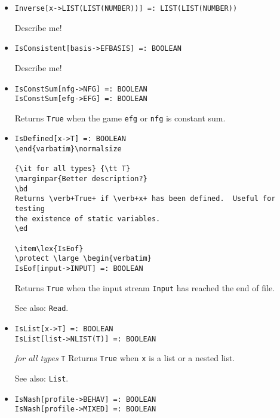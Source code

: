 \begin{itemize}
\item{}
\protect \large \begin{verbatim}
Inverse[x->LIST(LIST(NUMBER))] =: LIST(LIST(NUMBER))
\end{verbatim} \normalsize

\bd
Describe me!
\ed

\item{}
\protect \large \begin{verbatim}
IsConsistent[basis->EFBASIS] =: BOOLEAN
\end{verbatim} \normalsize

\bd
Describe me!
\ed

\item{}
\protect \large \begin{verbatim}
IsConstSum[nfg->NFG] =: BOOLEAN 
IsConstSum[efg->EFG] =: BOOLEAN 
\end{verbatim}\normalsize

\bd
Returns \verb+True+ when the game \verb+efg+ or \verb+nfg+ is constant sum.
\ed

\item{}
\protect \large \begin{verbatim}
IsDefined[x->T] =: BOOLEAN
\end{varbatim}\normalsize

{\it for all types} {\tt T}
\marginpar{Better description?}
\bd
Returns \verb+True+ if \verb+x+ has been defined.  Useful for testing
the existence of static variables.
\ed

\item\lex{IsEof}
\protect \large \begin{verbatim}
IsEof[input->INPUT] =: BOOLEAN
\end{verbatim}\normalsize

\bd
Returns \verb+True+ when the input stream \verb+Input+ has reached the
end of file.
\item [See also:] \verb+Read+.
\ed

\item{}
\protect \large \begin{verbatim}
IsList[x->T] =: BOOLEAN 
IsList[list->NLIST(T)] =: BOOLEAN 
\end{verbatim}\normalsize

{\it for all types} {\tt T}
\bd 
Returns \verb+True+ when \verb+x+ is a list or a nested list.
\item
[See also:] \verb+List+.
\ed

\item{}
\protect \large \begin{verbatim}
IsNash[profile->BEHAV] =: BOOLEAN 
IsNash[profile->MIXED] =: BOOLEAN 
\end{verbatim}\normalsize


\end{itemize}
